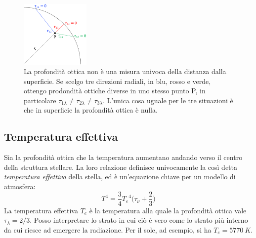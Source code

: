 \begin{figure}
    \centering
    \includegraphics[width=0.3\textwidth]{immagini/profondita-ottica-atmosfera.png}
    \caption{La profondità ottica non è una misura univoca della distanza dalla superficie. Se scelgo tre direzioni radiali, in blu, rosso e verde, ottengo prodondità ottiche diverse in uno stesso punto P, in particolare $\tau_{1\lambda} \neq \tau_{2\lambda} \neq \tau_{3\lambda}$. L'unica cosa uguale per le tre situazioni è che in superficie la profondità ottica è nulla.}
    \label{fig:profondita-ottica-atmosfera}
\end{figure}

\subsection{Temperatura effettiva}
Sia la profondità ottica che la temperatura aumentano andando verso il centro della struttura stellare. La loro relazione definisce univocamente la così detta \emph{temperatura effettiva} della stella, ed è un'equazione chiave per un modello di atmosfera:
\begin{equation}\label{temperatura-effettiva}
    T^4 = \frac{3}{4} {T_e}^4 \bigl( \tau_\nu + \frac{2}{3} \bigr)
\end{equation}
La temperatura effettiva $T_e$ è la temperatura alla quale la profondità ottica vale $\tau_\lambda = 2 / 3$. Posso interpretare lo strato in cui ciò è vero come lo strato più interno da cui riesce ad emergere la radiazione. Per il sole, ad esempio, si ha $T_e = \SI{5770}{K}$.

